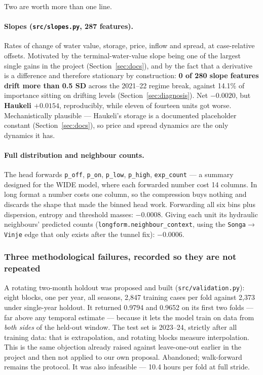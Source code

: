 Two are worth more than one line.

\paragraph{Slopes (\texttt{src/slopes.py}, 287 features).} Rates of change of water value,
storage, price, inflow and spread, at case-relative offsets. Motivated by the terminal-water-value
slope being one of the largest single gains in the project (Section~\ref{sec:docs}), and by the
fact that a derivative is a difference and therefore stationary by construction: \textbf{0 of 280
slope features drift more than 0.5 SD} across the 2021--22 regime break, against 14.1\% of
importance sitting on drifting levels (Section~\ref{sec:diagnosis}). Net $-0.0020$, but
\textbf{Haukeli $+0.0154$}, reproducibly, while eleven of fourteen units got worse. Mechanistically
plausible --- Haukeli's storage is a documented placeholder constant (Section~\ref{sec:docs}), so
price and spread dynamics are the only dynamics it has.

\paragraph{Full distribution and neighbour counts.} The head forwards \texttt{p\_off},
\texttt{p\_on}, \texttt{p\_low}, \texttt{p\_high}, \texttt{exp\_count} --- a summary designed for
the WIDE model, where each forwarded number cost 14 columns. In long format a number costs one
column, so the compression buys nothing and discards the shape that made the binned head work.
Forwarding all six bins plus dispersion, entropy and threshold masses: $-0.0008$. Giving each
unit its hydraulic neighbours' predicted counts (\texttt{longform.neighbour\_context}, using the
\texttt{Songa}$\to$\texttt{Vinje} edge that only exists after the tunnel fix): $-0.0006$.

\subsubsection*{Three methodological failures, recorded so they are not repeated}

\begin{finding}
A rotating two-month holdout was proposed and built (\texttt{src/validation.py}): eight blocks,
one per year, all seasons, 2{,}847 training cases per fold against 2{,}373 under single-year
holdout. It returned 0.9794 and 0.9652 on its first two folds --- far above any temporal estimate
--- because it lets the model train on data from \emph{both sides} of the held-out window. The
test set is 2023--24, strictly after all training data: that is extrapolation, and rotating blocks
measure interpolation. This is the same objection already raised against leave-one-out earlier in
the project and then not applied to our own proposal. Abandoned; walk-forward remains the protocol.
It was also infeasible --- 10.4 hours per fold at full stride.
\end{finding}

